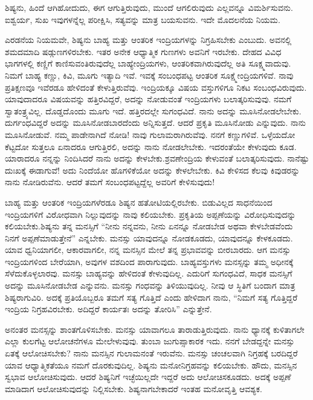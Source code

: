 ಶಿಷ್ಯನು, ಹಿಂದೆ ಆಗಿಹೋದುದು, ಈಗ ಆಗುತ್ತಿರುವುದು, ಮುಂದೆ ಆಗಲಿರುವುದು ಎಲ್ಲವನ್ನೂ ವಿಮರ್ಶಿಸುವನು. ಐಶ್ವರ್ಯ, ಸುಖ ಇವುಗಳನ್ನೆಲ್ಲ ಪರೀಕ್ಷಿಸಿ, ಸತ್ಯವನ್ನು ಮಾತ್ರ ಬಯಸುವನು. ಇದೇ ಮೊದಲನೆಯ ನಿಯಮ.

ಎರಡನೆಯ ನಿಯಮವೇ, ಶಿಷ್ಯನು ಬಾಹ್ಯ ಮತ್ತು ಆಂತರಿಕ ಇಂದ್ರಿಯಗಳನ್ನು ನಿಗ್ರಹಿಸಬೇಕು ಎಂಬುದು. ಅವನಲ್ಲಿ ಶಮದಮಾದಿ ಷಡ್ಗುಣಗಳಿರಬೇಕು. ಇತರ ಅನೇಕ ಆಧ್ಯಾತ್ಮಿಕ ಗುಣಗಳು ಅವನಿಗೆ ಇರಬೇಕು. ದೇಹದ ವಿವಿಧ ಭಾಗಗಳಲ್ಲಿ ಕಣ್ಣಿಗೆ ಕಾಣಿಸುವಂತಿರುವುದೆಲ್ಲ ಬಾಹ್ಯೇಂದ್ರಿಯಗಳು, ಆಂತರಿಕವಾಗಿರುವುದೆಲ್ಲ ಅತಿ ಸೂಕ್ಷ್ಮವಾದುವು. ನಿಮಗೆ ಬಾಹ್ಯ ಕಣ್ಣು, ಕಿವಿ, ಮೂಗು ಇತ್ಯಾದಿ ಇವೆ. ಇವಕ್ಕೆ ಸಂಬಂಧಪಟ್ಟ ಆಂತರಿಕ ಸೂಕ್ಷ್ಮೇಂದ್ರಿಯಗಳಿವೆ. ನಾವು ಪ್ರತಿಕ್ಷಣವೂ ಇವೆರಡೂ ಹೇಳಿದಂತೆ ಕೇಳುತ್ತಿರುವೆವು. ಇಂದ್ರಿಯಕ್ಕೂ ವಿಷಯ ವಸ್ತುಗಳಿಗೂ ನಿಕಟ ಸಂಬಂಧವಿರುವುದು. ಯಾವುದಾದರೂ ವಿಷಯವನ್ನು ಹತ್ತಿರವಿದ್ದರೆ, ಅದನ್ನು ನೋಡುವಂತೆ ಇಂದ್ರಿಯಗಳು ಬಲಾತ್ಕರಿಸುವುವು. ನಮಗೆ ಸ್ವಾತಂತ್ರ್ಯವಿಲ್ಲ. ದೊಡ್ಡದೊಂದು ಮೂಗು ಇದೆ. ಹತ್ತಿರದಲ್ಲೇ ಸುಗಂಧವಿದೆ. ನಾನು ಅದನ್ನು ಮೂಸಿನೋಡಲೇಬೇಕು. ದುರ್ಗಂಧವಿದ್ದರೆ ಅದನ್ನು ಮೂಸಿನೋಡಬಾರದೆಂದು ಅನ್ನಿಸುತ್ತದೆ. ಆದರೆ ಪ್ರಕೃತಿ ಮೂಸಿನೋಡು ಎನ್ನುವುದು. ನಾನು ಮೂಸಿನೋಡುವೆ. ನಮ್ಮ ಪಾಡೇನಾಗಿದೆ ನೋಡಿ! ನಾವು ಗುಲಾಮರಾಗಿರುವೆವು. ನನಗೆ ಕಣ್ಣುಗಳಿವೆ. ಒಳ್ಳೆಯದೋ ಕೆಟ್ಟದೋ ಸುತ್ತಲೂ ಏನಾದರೂ ಆಗುತ್ತಿರಲಿ, ಅದನ್ನು ನಾನು ನೋಡಲೇಬೇಕು. ಇದರಂತೆಯೇ ಕೇಳುವುದು ಕೂಡ. ಯಾರಾದರೂ ನನ್ನನ್ನು ನಿಂದಿಸಿದರೆ ನಾನು ಅದನ್ನು ಕೇಳಬೇಕು.\break ಶ್ರವಣೇಂದ್ರಿಯ ಕೇಳುವಂತೆ ಬಲಾತ್ಕರಿಸುವುದು. ನಾನೆಷ್ಟು ದುಃಖಕ್ಕೆ ಈಡಾಗುವೆ! ಅದು ನಿಂದೆಯೋ ಹೊಗಳಿಕೆಯೋ ಅದನ್ನು ಕೇಳಲೇಬೇಕು. ಕಿವಿ ಕೇಳಿಸದ ಕೆಲವು ಕಿವುಡರನ್ನು ನಾನು ನೋಡಿರುವೆನು. ಆದರೆ ತಮಗೆ ಸಂಬಂಧಪಟ್ಟದ್ದೆಲ್ಲ ಅವರಿಗೆ ಕೇಳಿಸುವುದು!

ಬಾಹ್ಯ ಮತ್ತು ಆಂತರಿಕ ಇಂದ್ರಿಯಗಳೆರಡೂ ಶಿಷ್ಯನ ಹತೋಟಿಯಲ್ಲಿರಬೇಕು. ಬಿಡುವಿಲ್ಲದ ಸಾಧನೆಯಿಂದ ಇಂದ್ರಿಯಗಳಿಗೆ ವಿರೋಧವಾಗಿ ನಿಲ್ಲುವುದನ್ನು ನಾವು ಕಲಿಯಬೇಕು. ಪ್ರಕೃತಿಯ ಅಪ್ಪಣೆಯನ್ನು ವಿರೋಧಿಸುವುದನ್ನು ಕಲಿಯಬೇಕು.\break ಶಿಷ್ಯನು ತನ್ನ ಮನಸ್ಸಿಗೆ “ನೀನು ನನ್ನವನು, ನೀನು ಏನನ್ನೂ ನೋಡಬೇಡ ಅಥವಾ ಕೇಳಬೇಡವೆಂದು ನಿನಗೆ ಅಪ್ಪಣೆಮಾಡುತ್ತೇನೆ'' ಎನ್ನಬೇಕು. ಮನಸ್ಸು ಯಾವುದನ್ನೂ ನೋಡಕೂಡದು, ಯಾವುದನ್ನೂ ಕೇಳಕೂಡದು. ಯಾವ ಧ್ವನಿಯಾಗಲೀ, ಆಕಾರವಾಗಲೀ, ನನ್ನ ಮನಸ್ಸಿನ ಮೇಲೆ ತನ್ನ ಪ್ರಭಾವವನ್ನು ಬೀರಬಾರದು. ಆಗ ಮನಸ್ಸು ಇಂದ್ರಿಯಗಳಿಂದ ಬೇರೆಯಾಗಿ, ಅವುಗಳ ವಶದಿಂದ ಪಾರಾಗುವುದು. ಬಾಹ್ಯವಸ್ತುಗಳು ಮನಸ್ಸನ್ನು ತಮ್ಮ ಅಧೀನಕ್ಕೆ ಸೆಳೆದುಕೊಳ್ಳಲಾರವು. ಮನಸ್ಸು ಬಾಹ್ಯವನ್ನು ಹೇಳಿದಂತೆ ಕೇಳುವುದಿಲ್ಲ. ಎದುರಿಗೆ ಸುಗಂಧವಿದೆ, ಸಾಧಕ ಮನಸ್ಸಿಗೆ ಅದನ್ನು ಮೂಸಿನೋಡಬೇಡ ಎನ್ನುವನು. ಮನಸ್ಸು ಗಂಧವನ್ನು ತಿಳಿಯುವುದಿಲ್ಲ. ನೀವು ಆ ಸ್ಥಿತಿಗೆ ಬಂದಾಗ ಮಾತ್ರ ಶಿಷ್ಯರಾಗುವಿರಿ. ಅದಕ್ಕೆ ಪ್ರತಿಯೊಬ್ಬರೂ ತಮಗೆ ಸತ್ಯ ಗೊತ್ತಿದೆ ಎಂದು ಹೇಳಿದಾಗ ನಾನು, “ನಿಮಗೆ ಸತ್ಯ ಗೊತ್ತಿದ್ದರೆ ಇಂದ್ರಿಯ ನಿಗ್ರಹವಿರಬೇಕು. ಅದಿದ್ದರೆ ಕಾರ್ಯತಃ ಅದನ್ನು ತೋರಿಸಿ” ಎನ್ನುತ್ತೇನೆ.

ಅನಂತರ ಮನಸ್ಸನ್ನು ಶಾಂತಗೊಳಿಸಬೇಕು. ಮನಸ್ಸು ಯಾವಾಗಲೂ ತಾರಾಡುತ್ತಿರುವುದು. ನಾನು ಧ್ಯಾನಕ್ಕೆ ಕುಳಿತಾಗಲೇ ಎಲ್ಲಾ ಕುಲಗೆಟ್ಟ ಆಲೋಚನೆಗಳೂ ಮೇಲೇಳುವುವು. ತುಂಬಾ ಜುಗುಪ್ಸಾಕಾರಕ ಇದು. ನನಗೆ ಬೇಡದ್ದನ್ನೇ ಮನಸ್ಸು ಏತಕ್ಕೆ ಆಲೋಚಿಸಬೇಕು? ನಾನು ಮನಸ್ಸಿನ ಗುಲಾಮನಂತೆ ಇರುವೆನು. ಮನಸ್ಸು ಚಂಚಲವಾಗಿ ನಿಗ್ರಹಕ್ಕೆ ಬರದಿದ್ದರೆ ಯಾವ ಆಧ್ಯಾತ್ಮಿಕತೆಯೂ ನಮಗೆ ದೊರಕುವುದಿಲ್ಲ. ಶಿಷ್ಯನು ಮನೋನಿಗ್ರಹವನ್ನು ಕಲಿಯಬೇಕು. ಹೌದು, ಮನಸ್ಸಿನ ಸ್ವಭಾವ ಆಲೋಚಿಸುವುದು. ಆದರೆ ಶಿಷ್ಯನಿಗೆ ಇಚ್ಛೆಯಿಲ್ಲದೇ ಇದ್ದರೆ ಅದು ಆಲೋಚಿಸಕೂಡದು. ಅದಕ್ಕೆ ಅಪ್ಪಣೆ ಮಾಡಿದಾಗ ಆಲೋಚಿಸುವುದನ್ನು ನಿಲ್ಲಿಸಬೇಕು. ಶಿಷ್ಯನಾಗಬೇಕಾದರೆ ಇಂತಹ ಮನೋವೃತ್ತಿ ಆವಶ್ಯಕ.

